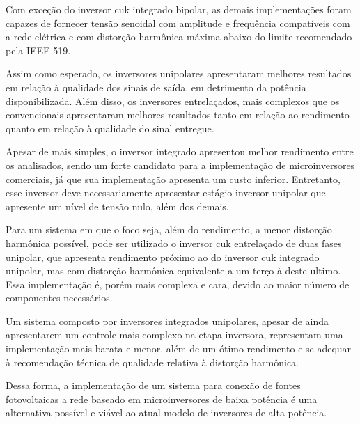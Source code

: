 \documentclass[
	12pt,				%
	openany,
	onseside,
	a4paper,			%
	english,			%
	french,				%
	spanish,			%
	brazil,				%
	]{abntex2}
\begin{document}
Com exceção do inversor cuk integrado bipolar, as demais implementações foram capazes de fornecer tensão senoidal com amplitude e frequência compatíveis com a rede elétrica e com distorção harmônica máxima abaixo do limite recomendado pela IEEE-519.

Assim como esperado, os inversores unipolares apresentaram melhores resultados em relação à qualidade dos sinais de saída, em detrimento da potência disponibilizada. Além disso, os inversores entrelaçados, mais complexos que os convencionais apresentaram melhores resultados tanto em relação ao rendimento quanto em relação à qualidade do sinal entregue. 

Apesar de mais simples, o inversor integrado apresentou melhor rendimento entre os analisados, sendo um forte candidato para a implementação de microinversores comerciais, já que sua implementação apresenta um custo inferior. Entretanto, esse inversor deve necessariamente apresentar estágio inversor unipolar que apresente um nível de tensão nulo, além dos demais.

Para um sistema em que o foco seja, além do rendimento, a menor distorção harmônica possível, pode ser utilizado o inversor cuk entrelaçado de duas fases unipolar, que apresenta rendimento próximo ao do inversor cuk integrado unipolar, mas com distorção harmônica equivalente a um terço à deste ultimo. Essa implementação é, porém mais complexa e cara, devido ao maior número de componentes necessários.

Um sistema composto por inversores integrados unipolares, apesar de ainda apresentarem um controle mais complexo na etapa inversora, representam uma implementação mais barata e menor, além de um ótimo rendimento e se adequar à recomendação técnica de qualidade relativa à distorção harmônica.

Dessa forma, a implementação de um sistema para conexão de fontes fotovoltaicas a rede baseado em microinversores de baixa potência é uma alternativa possível e viável ao atual modelo de inversores de alta potência. 

% 

\postextual


\end{document}
